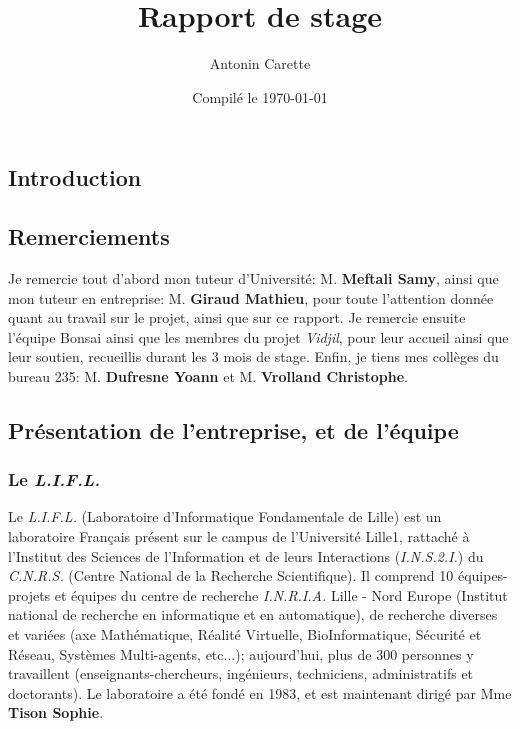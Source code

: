\documentclass[12pt]{report}
\title{Rapport de stage}
\author{Antonin Carette}
\date{Compilé le \today}
\begin{document}
\begin{spacing}{1.2}

\maketitle

\tableofcontents

\chapter*{Introduction}


\section{Remerciements}
Je remercie tout d'abord mon tuteur d'Université: M. \textbf{Meftali Samy}, ainsi que mon tuteur en entreprise: M. \textbf{Giraud Mathieu}, pour toute l'attention donnée quant au travail sur le projet, ainsi que sur ce rapport.
\newline
Je remercie ensuite l'équipe Bonsai ainsi que les membres du projet \textit{Vidjil}, pour leur accueil ainsi que leur soutien, recueillis durant les 3 mois de stage.
\newline
Enfin, je tiens mes collèges du bureau 235: M. \textbf{Dufresne Yoann} et M. \textbf{Vrolland Christophe}.

\section{Présentation de l'entreprise, et de l'équipe}

\subsection{Le \textit{L.I.F.L.}}
Le \textit{L.I.F.L.} (Laboratoire d'Informatique Fondamentale de Lille) est un laboratoire Français présent sur le campus de l'Université Lille1, rattaché à l'Institut des Sciences de l'Information et de leurs Interactions (\textit{I.N.S.2.I.}) du \textit{C.N.R.S.} (Centre National de la Recherche Scientifique).
\newline
Il comprend 10 équipes-projets et équipes du centre de recherche \textit{I.N.R.I.A.} Lille - Nord Europe (Institut national de recherche en informatique et en automatique), de recherche diverses et variées (axe Mathématique, Réalité Virtuelle, BioInformatique, Sécurité et Réseau, Systèmes Multi-agents, etc...); aujourd'hui, plus de 300 personnes y travaillent (enseignants-chercheurs, ingénieurs, techniciens, administratifs et doctorants).
\newline
Le laboratoire a été fondé en 1983, et est maintenant dirigé par Mme \textbf{Tison Sophie}.


\end{spacing}
\end{document}
